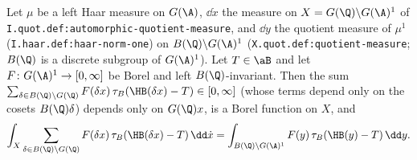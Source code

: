 Let $\mu$ be a left Haar measure on $G(\A)$, $\dd\dot x$ the measure on $X=G(\Q)\backslash G(\A)^1$ of \texttt{I.quot.def:automorphic-quotient-measure}, and $\dd y$ the quotient
measure of $\mu^1$ (\texttt{I.haar.def:haar-norm-one}) on $B(\Q)\backslash G(\A)^1$ (\texttt{X.quot.def:quotient-measure}; $B(\Q)$ is a discrete subgroup of $G(\A)^1$). Let
$T\in\aB$ and let $F\colon G(\A)^1\to[0,\infty]$ be Borel and left $B(\Q)$-invariant. Then the sum
$\sum_{\delta\in B(\Q)\backslash G(\Q)}F(\delta x)\,\tau_B(\HB(\delta x)-T)\in[0,\infty]$ (whose terms depend only on the cosets $B(\Q)\delta$) depends only on $G(\Q)x$, is a
Borel function on $X$, and
\[
  \int_X\sum_{\delta\in B(\Q)\backslash G(\Q)}F(\delta x)\,\tau_B(\HB(\delta x)-T)\,\dd\dot x=\int_{B(\Q)\backslash G(\A)^1}F(y)\,\tau_B(\HB(y)-T)\,\dd y .
\]
